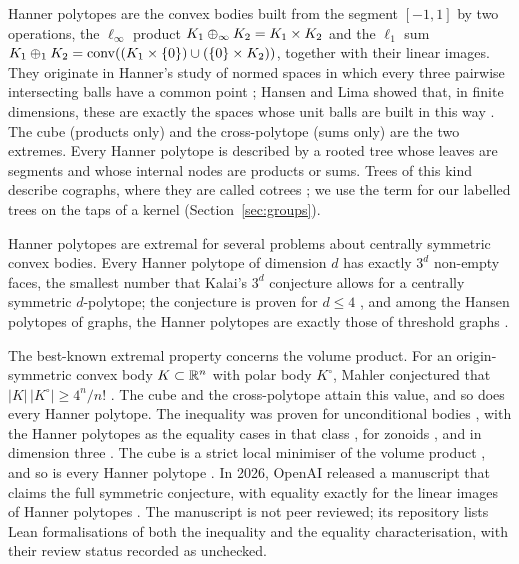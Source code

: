 Hanner polytopes are the convex bodies built from the segment $[-1,1]$ by two operations,
the $\ell_\infty$ product $K_1\oplus_\infty K_2=K_1\times K_2$ and the $\ell_1$ sum
$K_1\oplus_1 K_2=\operatorname{conv}((K_1\times\{0\})\cup(\{0\}\times K_2))$, together with
their linear images. They originate in Hanner's study of normed spaces in which every three
pairwise intersecting balls have a common point \citep{hanner1956intersections}; Hansen and
Lima showed that, in finite dimensions, these are exactly the spaces whose unit balls are
built in this way \citep{hansen1981structure}. The cube (products only) and the
cross-polytope (sums only) are the two extremes. Every Hanner polytope is described by a
rooted tree whose leaves are segments and whose internal nodes are products or sums. Trees
of this kind describe cographs, where they are called cotrees
\citep{corneil1981cographs}; we use the term for our labelled trees on the taps of a kernel
(Section~\ref{sec:groups}).

Hanner polytopes are extremal for several problems about centrally symmetric convex bodies.
Every Hanner polytope of dimension $d$ has exactly $3^d$ non-empty faces, the smallest
number that Kalai's $3^d$ conjecture allows for a centrally symmetric $d$-polytope; the
conjecture is proven for $d\le4$ \citep{sanyal2009kalai}, and among the Hansen polytopes
of graphs, the Hanner polytopes are exactly those of threshold graphs
\citep{freij2013hansen}.

The best-known extremal property concerns the volume product. For an origin-symmetric
convex body $K\subset\mathbb{R}^n$ with polar body $K^\circ$, Mahler conjectured that
$|K|\,|K^\circ|\ge 4^n/n!$ \citep{mahler1939uebertragung}. The cube and the cross-polytope
attain this value, and so does every Hanner polytope. The inequality was proven for
unconditional bodies \citep{saintraymond1981}, with the Hanner polytopes as the equality
cases in that class \citep{meyer1986caracterisation}, for zonoids
\citep{reisner1986zonoids}, and in dimension three
\citep{iriyeh2020mahler,fradelizi2022mahler}. The cube is a strict local minimiser of the
volume product \citep{nazarov2010mahler}, and so is every Hanner polytope
\citep{kim2014hanner}. In 2026, OpenAI released a manuscript that claims the full symmetric
conjecture, with equality exactly for the linear images of Hanner polytopes
\citep[Theorem~1.1]{openai2026mahler}. The manuscript is not peer reviewed; its repository
lists Lean formalisations of both the inequality and the equality characterisation, with
their review status recorded as unchecked.

